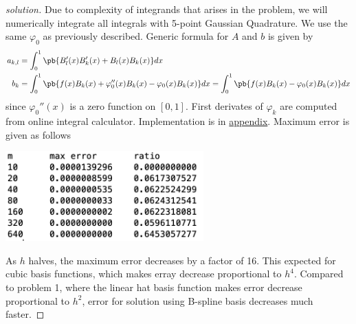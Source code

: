 \documentclass[11pt]{article}
\begin{document}
\begin{proof}[solution]
    Due to complexity of integrands that arises in the problem, we will numerically integrate all integrals with 5-point Gaussian Quadrature. We use the same $\varphi_0$ as previously described. Generic formula for $A$ and $b$ is given by 
    \begin{align*}
        a_{k,l} 
        &= \int_0^1 \pb{B_l'(x) B_k'(x) + B_l(x) B_k(x)} dx \\
        b_k 
        &= \int_0^1 \pb{f(x) B_k(x) + \varphi_0''(x)B_k(x) - \varphi_0(x) B_k(x)} dx
        = \int_0^1 \pb{f(x) B_k(x) - \varphi_0(x) B_k(x)} dx
    \end{align*}
    since $\varphi_0''(x)$ is a zero function on $[0,1]$. First derivates of $\varphi_k$ are computed from online integral calculator. Implementation is in \hyperref[q2code]{appendix}. Maximum error is given as follows
    \begin{center}
        \includegraphics[width=3in]{q2_out} 
    \end{center}
    As $h$ halves, the maximum error decreases by a factor of 16. This expected for cubic basis functions, which makes erray decrease proportional to $h^4$. Compared to problem 1, where the linear hat basis function makes error decrease proportional to $h^2$, error for solution using B-spline basis decreases much faster.
\end{proof}
\end{document}
